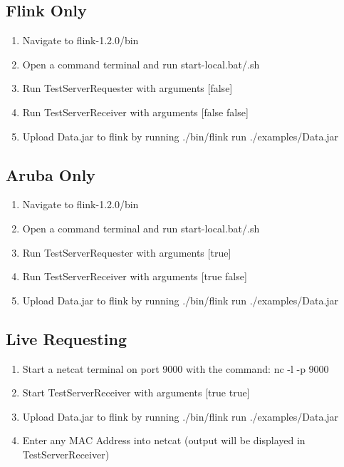 \documentclass{article}
\begin{document}
\subsection{Flink Only}
\begin{enumerate}
\item Navigate to flink-1.2.0/bin
\item Open a command terminal and run start-local.bat/.sh
\item Run TestServerRequester with arguments [false]
\item Run TestServerReceiver with arguments [false false]
\item Upload Data.jar to flink by running ./bin/flink run ./examples/Data.jar
\end{enumerate}
\subsection{Aruba Only}
\begin{enumerate}
\item Navigate to flink-1.2.0/bin
\item Open a command terminal and run start-local.bat/.sh
\item Run TestServerRequester with arguments [true]
\item Run TestServerReceiver with arguments [true false]
\item Upload Data.jar to flink by running ./bin/flink run ./examples/Data.jar
\end{enumerate}
\subsection{Live Requesting}
\begin{enumerate}
\item Start a netcat terminal on port 9000 with the command: nc -l -p 9000
\item Start TestServerReceiver with arguments [true true]
\item Upload Data.jar to flink by running ./bin/flink run ./examples/Data.jar
\item Enter any MAC Address into netcat (output will be displayed in TestServerReceiver)
\end{enumerate}
\end{document}
